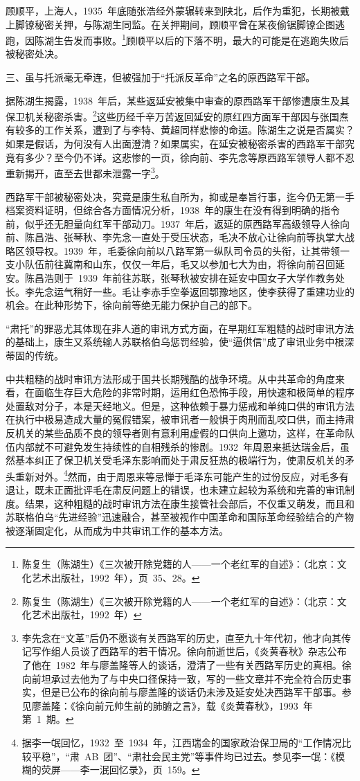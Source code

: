 顾顺平，上海人，1935~年底随张浩经外蒙辗转来到陕北，后作为重犯，长期被戴上脚镣秘密关押，与陈湖生同监。在关押期间，顾顺平曾在某夜偷锯脚镣企图逃跑，因陈湖生告发而事败。\footnote{陈复生（陈湖生）《三次被开除党籍的人——一个老红军的自述》：（北京：文化艺术出版社，1992~年），页~35、28。}顾顺平以后的下落不明，最大的可能是在逃跑失败后被秘密处决。

三、虽与托派毫无牵连，但被强加于“托派反革命”之名的原西路军干部。

据陈湖生揭露，1938~年后，某些返延安被集中审查的原西路军干部惨遭康生及其保卫机关秘密杀害。\footnote{陈复生（陈湖生）《三次被开除党籍的人——一个老红军的自述》：（北京：文化艺术出版社，1992~年）}这些历经千辛万苦返回延安的原红四方面军干部因与张国焘有较多的工作关系，遭到了与李特、黄超同样悲惨的命运。陈湖生之说是否属实？如果是假话，为何没有人出面澄清？如果属实，在延安被秘密杀害的西路军干部究竟有多少？至今仍不详。这悲惨的一页，徐向前、李先念等原西路军领导人都不忍重新揭开，直至去世都未泄露一字\footnote{李先念在“文革”后仍不愿谈有关西路军的历史，直至九十年代初，他才向其传记写作组人员谈了西路军的若干情况。徐向前逝世后，《炎黄春秋》杂志公布了他在~1982~年与廖盖隆等人的谈话，澄清了一些有关西路军历史的真相。徐向前坦承过去他为了与中央口径保持一致，写的一些文章并不完全符合历史事实，但是已公布的徐向前与廖盖隆的谈话仍未涉及延安处决西路军干部事。参见廖盖隆：《徐向前元帅生前的肺腑之言》，载《炎黄春秋》，1993~年第~1~期。}。

西路军干部被秘密处决，究竟是康生私自所为，抑或是奉旨行事，迄今仍无第一手档案资料证明，但综合各方面情况分析，1938~年的康生在没有得到明确的指令前，似乎还无胆量向红军干部动刀。1937~年后，返延的原西路军高级领导人徐向前、陈昌浩、张琴秋、李先念一直处于受压状态，毛决不放心让徐向前等执掌大战略区领导权。1939~年，毛委徐向前以八路军第一纵队司令员的头衔，让其带领一支小队伍前往冀南和山东，仅仅一年后，毛又以参加七大为由，将徐向前召回延安。陈昌浩则于~1939~年前往苏联，张琴秋被安排在延安中国女子大学作教务处长。李先念运气稍好一些。毛让李赤手空拳返回鄂豫地区，使李获得了重建功业的机会。在此种形势下，徐向前等绝无能力保护自己的部下。

“肃托”的罪恶尤其体现在非人道的审讯方式方面，在早期红军粗糙的战时审讯方法的基础上，康生又系统输人苏联格伯乌惩罚经验，使“逼供信”成了审讯业务中根深蒂固的传统。

中共粗糙的战时审讯方法形成于国共长期残酷的战争环境。从中共革命的角度来看，在面临生存巨大危险的非常时期，运用红色恐怖手段，用快速和极简单的程序处置敌对分子，本是天经地义。但是，这种依赖于暴力惩戒和单纯口供的审讯方法在执行中极易造成大量的冤假错案，被审讯者一般惧于肉刑而乱咬口供，而主持肃反机关的某些品质不良的领导者则有意利用虚假的口供向上邀功，这样，在革命队伍内部就不可避免发生持续性的自相残杀的惨剧。1932~年周恩来抵达瑞金后，虽然基本纠正了保卫机关受毛泽东影响而处于肃反狂热的极端行为，使肃反机关的矛头重新对外。\footnote{据李一氓回忆，1932~至~1934~年，江西瑞金的国家政治保卫局的“工作情况比较平稳”，“肃~AB~团”、“肃社会民主党”等事件均已过去。参见李一氓：《模糊的荧屏——李一泯回忆录》，页~159。}然而，由于周恩来等忌惮于毛泽东可能产生的过份反应，对毛多有退让，既未正面批评毛在肃反问题上的错误，也未建立起较为系统和完善的审讯制度。结果，这种粗糙的战时审讯方法在康生接管社会部后，不仅重又萌发，而且和苏联格伯乌“先进经验”迅速融合，甚至被视作中国革命和国际革命经验结合的产物被逐渐固定化，从而成为中共审讯工作的基本方法。

